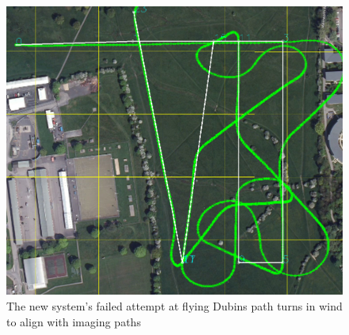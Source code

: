 \begin{figure}[htbp!] 
\centering    
\includegraphics[width=\textwidth]{5Wind_32_20}
\caption[An attempt at flying Dubins path turns in wind]{The new system's failed attempt at flying Dubins path turns in wind to align with imaging paths}
\label{fig:3220withwind}
\end{figure} 

